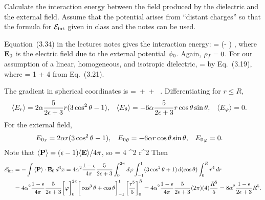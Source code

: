 \newcommand{\evPr}{\ev{P_r}}
\newcommand{\evPth}{\ev{P_\tht}}
\newcommand{\evPph}{\ev{P_\vph}}
\newcommand{\dph}{\dd{\vph}}
\newcommand{\intRi}{\int_R^\infty}
\newcommand{\intoR}{\int_0^R}

\begin{problem}
	Calculate the interaction energy between the field produced by the dielectric and the external field.  Assume that the potential arises from ``distant charges'' so that the formula for $\mathcal{E}_\text{int}$ given in class and the notes can be used.
\end{problem}

\begin{solution}
	Equation~(3.34) in the lectures notes gives the interaction energy:
	\beq
		\sEint = \int (\evrhof \!\phio - \evP \cdot \vEo) \dcx,
	\eeq
	where $\vb{E}_0$ is the electric field due to the external potential $\phi_0$.  Again, $\rho_f = 0$.  For our assumption of a linear, homogeneous, and isotropic dielectric,
	\beq
		\evP = \chi \!\evE
	\eeq
	by Eq.~(3.19), where
	\beq
		\eps = 1 + 4\pi \chi
	\eeq
	from Eq.~(3.21).
	
	The gradient in spherical coordinates is
	\beqn \label{grad}
		\grad =  \,\rh +  \pdv{}{\tht} \,\thh +  \pdv{}{\vph} \, \phh.
	\eeqn
	Differentiating  for $r \leq R$,
	\begin{align} \label{Ein}
		\evEr &= 2 \alp \frac{5}{2\eps + 3} r (3 \cos^2\tht - 1), &
		\evEth &= -6 \alp \frac{5}{2\eps + 3} r \cost \sint, &
		\evEph &= 0.
	\end{align}
	For the external field,
	\begin{align} \label{E0}
		{E_0}_r &= 2 \alpha r (3 \cos^2\theta - 1), &
		{E_0}_\theta &= -6 \alpha r \cos\theta \sin\theta, &
		{E_0}_\varphi &= 0.
	\end{align}
	Note that $\evP = (\eps - 1) \!\evE\! / 4 \pi$, so
	\beq
		\evP \cdot \vEo = 4 \alp^2   r^2 
	\eeq
	Then
	\begin{align*}
		\sEint &= -\int \evP \cdot \vEo \dcx
		= 4 \alp^2 \frac{1 - \eps}{4\pi} \frac{5}{2\eps + 3} \intotp \dph \intono (3 \cos^2\tht + 1) \dct \intoR r^4 \dr \\
		&= 4 \alp^2 \frac{1 - \eps}{4\pi} \frac{5}{2\eps + 3} \bigg[ \vph \bigg]_0^{2\pi} \bigg[ \cos^3\tht + \cost \bigg]_{-1}^1 \left[ \frac{r^5}{5} \right]_0^R
		= 4 \alp^2 \frac{1 - \eps}{4\pi} \frac{5}{2\eps + 3} (2\pi) (4) \frac{R^5}{5}
		= 8 \alp^2 \frac{1 - \eps}{2\eps + 3} R^5.
	\end{align*}
\end{solution}
\vfix



